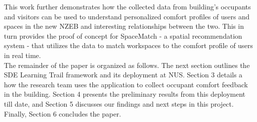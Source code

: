 This work further demonstrates how the collected data from building's occupants and visitors can be used to understand personalized comfort profiles of users and spaces in the new NZEB and interesting relationships between the two. This in turn provides the proof of concept for SpaceMatch - a spatial recommendation system - that utilizes the data to match workspaces to the comfort profile of users in real time.\\

The remainder of the paper is organized as follows. The next section outlines the SDE Learning Trail framework and its deployment at NUS. Section 3 details a how the research team uses the application to collect occupant comfort feedback in the building. Section 4 presents the preliminary results from this deployment till date, and Section 5 discusses our findings and next steps in this project. Finally, Section 6 concludes the paper. 







